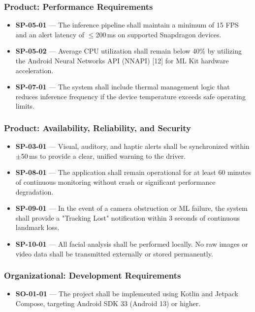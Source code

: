 \documentclass[11pt]{report}
\begin{document}
\subsubsection{Product: Performance Requirements}
\begin{itemize}
    \item \textbf{SP-05-01} — The inference pipeline shall maintain a minimum of 15 FPS and an alert latency of $\leq$200\,ms on supported Snapdragon devices.
    \item \textbf{SP-05-02} — Average CPU utilization shall remain below 40\% by utilizing the Android Neural Networks API (NNAPI) [12] for ML Kit hardware acceleration.
    \item \textbf{SP-07-01} — The system shall include thermal management logic that reduces inference frequency if the device temperature exceeds safe operating limits.
\end{itemize}

\subsubsection{Product: Availability, Reliability, and Security}
\begin{itemize}
    \item \textbf{SP-03-01} — Visual, auditory, and haptic alerts shall be synchronized within $\pm$50\,ms to provide a clear, unified warning to the driver.
    \item \textbf{SP-08-01} — The application shall remain operational for at least 60 minutes of continuous monitoring without crash or significant performance degradation.
    \item \textbf{SP-09-01} — In the event of a camera obstruction or ML failure, the system shall provide a "Tracking Lost" notification within 3 seconds of continuous landmark loss.
    \item \textbf{SP-10-01} — All facial analysis shall be performed locally. No raw images or video data shall be transmitted externally or stored permanently.
\end{itemize}

\subsubsection{Organizational: Development Requirements}
\begin{itemize}
    \item \textbf{SO-01-01} — The project shall be implemented using Kotlin and Jetpack Compose, targeting Android SDK 33 (Android 13) or higher.
\end{itemize}
\end{document}
